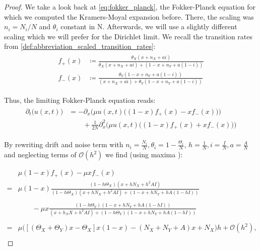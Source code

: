 \documentclass[12pt,a4paper,twoside]{article}
\begin{document}
\begin{proof}
	We take a look back at \eqref{eq:fokker_planck}, the Fokker-Planck equation for which we computed the Kramers-Moyal expansion before.
	There, the scaling was $n_i = N_i/N$ and $\theta_i$ constant in N. Afterwards, we will use a slightly different scaling which we will prefer for the Dirichlet limit. We recall the transition rates from \eqref{def:abbreviation_scaled_transition_rates}:
	\begin{align}
	\begin{split}
	f_+(x) &\coloneqq \frac{\theta_X (x+ n_X+ ai)}{\theta_X (x + n_X + ai) + (1-x + n_Y + a(1-i))}\\
	f_-(x) &\coloneqq \frac{\theta_Y(1-x+n_Y+a(1-i))}{(x+n_X+ai) + \theta_Y(1-x+n_Y+a(1-i))}
	\end{split}
	\end{align}
	
	Thus, the limiting Fokker-Planck equation reads:
	\begin{align}
	\begin{split}\label{eq:limiting_fokker-planck}
	\partial_t \big(u\left(x, t\right)\big) &= -\partial_x\Big(\mu u(x,t)\big(\left(1-x\right)f_+(x) - xf_-(x)\big)\Big) \\
	&\qquad + \frac{1}{2N} \partial^2_x\Big(\mu u(x,t)\big(\left(1-x\right)f_+(x) + xf_-(x)\big)\Big)
	\end{split}
	\end{align}
	
	By rewriting drift and noise term with $n_i = \frac{N_i}{N}, \theta_i = 1- \frac{\Theta_i}{N}$, $h = \frac{1}{N}, i= \frac{I}{N}, a = \frac{A}{N}$ and neglecting terms of $\mathcal{O}(h^2)$ we find (using maxima %
	):
	
	\begin{align*}
	& \mu(1-x)f_+(x) - \mu xf_-(x)\\
	= & \mu(1-x) \frac{(1-h\Theta_X) (x+ hN_X+ h^2AI)}{(1-h\Theta_X) (x + hN_X + h^2AI) + (1-x + hN_Y + hA(1-hI))}\\
	&\\
	&\qquad - \mu x \frac{(1-h\Theta_Y)(1-x+hN_Y+hA(1-hI))}{(x+h_NX+h^2AI) + (1-h\Theta_Y)(1-x+hN_Y+hA(1-hI))}\\
		&\\
	=& \mu\Big(\left[\left(\Theta_X + \Theta_Y\right)x - \Theta_X\right]x\left(1-x\right)-\left(N_X + N_Y + A\right)x + N_X\Big)h+ \mathcal{O}(h^2),\\
	\end{align*}
	

\end{proof}
\end{document}
